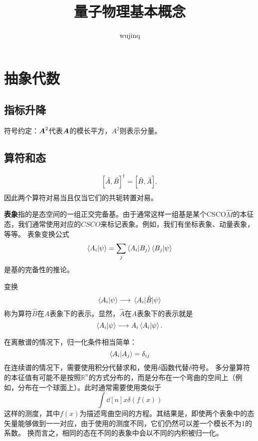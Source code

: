 \documentclass[UTF8, a4paper]{ctexart}
\title{量子物理基本概念}
\author{wujinq}
\newcommand*{\reals}{\mathbb{R}}
\begin{document}
\maketitle

\section{抽象代数}

\subsection{指标升降}

符号约定：$\vb*{A}^2$代表$\vb*{A}$的模长平方，$A^2$则表示分量。

\subsection{算符和态}

\[
    \comm{\hat{A}}{\hat{B}}^\dagger = \comm{\hat{B}}{\hat{A}},
\]
因此两个算符对易当且仅当它们的共轭转置对易。


\textbf{表象}指的是态空间的一组正交完备基。由于通常这样一组基是某个CSCO$\hat{M}$的本征态，我们通常使用对应的$CSCO$来标记表象。例如，我们有坐标表象、动量表象，等等。
表象变换公式
\begin{equation}
    \braket{A_i}{\psi} = \sum_j \braket{A_i}{B_j} \braket{B_j}{\psi}
\end{equation}
是基的完备性的推论。

变换
\[
    \braket{A_i}{\psi} \longrightarrow \mel{A_i}{\hat{B}}{\psi}
\]
称为算符$\hat{B}$在$A$表象下的表示。显然，$\hat{A}$在$A$表象下的表示就是
\[
    \braket{A_i}{\psi} \longrightarrow A_i \braket{A_i}{\psi}.
\]

在离散谱的情况下，归一化条件相当简单：
\[
    \braket{A_i}{A_j} = \delta_{ij}
\]
在连续谱的情况下，需要使用积分代替求和，使用$\delta$函数代替$\delta$符号。
多分量算符的本征值有可能不是按照$\reals^n$的方式分布的，而是分布在一个弯曲的空间上（例如，分布在一个球面上）。此时通常需要使用类似于
\[
    \int \dd[n]{x} \delta(f(x))
\]
这样的测度，其中$f(x)$为描述弯曲空间的方程。其结果是，即使两个表象中的态矢量能够做到一一对应，由于使用的测度不同，它们仍然可以差一个模长不为1的系数。
换而言之，相同的态在不同的表象中会以不同的内积被归一化。
\end{document}
